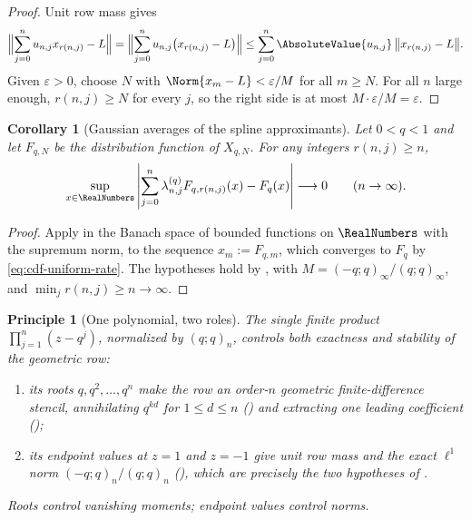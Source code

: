\documentclass[11pt,a4paper,oneside,openany]{book}
\newtheorem{corollary}[corollary]{Corollary}
\newtheorem{principle}[principle]{Principle}
\theoremstyle{definition}
\theoremstyle{remark}
\begin{document}
\begin{proof}
Unit row mass gives
\[
 \Bigl\|\sum_{j=0}^{n}u_{n,j}x_{r(n,j)}-L\Bigr\|
 =\Bigl\|\sum_{j=0}^{n}u_{n,j}\bigl(x_{r(n,j)}-L\bigr)\Bigr\|
 \le\sum_{j=0}^{n}\AbsoluteValue{u_{n,j}}\,\bigl\|x_{r(n,j)}-L\bigr\| .
\]
Given $\varepsilon>0$, choose $N$ with $\Norm{x_m-L}<\varepsilon/M$ for all $m\ge N$.
For all $n$ large enough, $r(n,j)\ge N$ for every $j$, so the right side is at most
$M\cdot\varepsilon/M=\varepsilon$.
\end{proof}

\begin{corollary}[Gaussian averages of the spline approximants]\label{cor:gaussian-row-spline-average}
Let $0<q<1$ and let $F_{q,N}$ be the distribution function of $X_{q,N}$.  For any
integers $r(n,j)\ge n$,
\[
 \sup_{x\in\RealNumbers}\left|\sum_{j=0}^{n}\lambda_{n,j}^{(q)}F_{q,r(n,j)}(x)-F_q(x)\right|
 \longrightarrow0
 \qquad(n\to\infty).
\]
\end{corollary}

\begin{proof}
Apply  in the Banach space of bounded functions on $\RealNumbers$ with
the supremum norm, to the sequence $x_m:=F_{q,m}$, which converges to $F_q$ by
\eqref{eq:cdf-uniform-rate}.  The hypotheses hold by
, with $M=(-q;q)_\infty/(q;q)_\infty$, and
$\min_jr(n,j)\ge n\to\infty$.
\end{proof}

\begin{principle}[One polynomial, two roles]\label{prin:row-exactness-stability}
The single finite product $\prod_{j=1}^{n}(z-q^j)$, normalized by $(q;q)_n$, controls
both exactness and stability of the geometric row:
\begin{enumerate}
\item its \emph{roots} $q,q^2,\ldots,q^n$ make the row an order-$n$ geometric
finite-difference stencil, annihilating $q^{kd}$ for $1\le d\le n$
() and extracting one leading coefficient
();
\item its \emph{endpoint values} at $z=1$ and $z=-1$ give unit row mass and the exact
$\ell^1$ norm $(-q;q)_n/(q;q)_n$ (), which are
precisely the two hypotheses of .
\end{enumerate}
Roots control vanishing moments; endpoint values control norms.
\end{principle}
\end{document}
